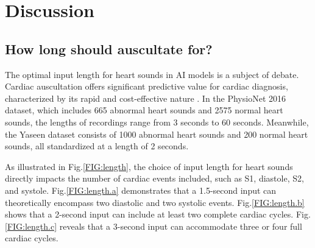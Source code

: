 \section{Discussion}\label{Discussion}
\subsection{How long should auscultate for?}
The optimal input length for heart sounds in AI models is a subject of debate. Cardiac auscultation offers significant predictive value for cardiac diagnosis, characterized by its rapid and cost-effective nature \cite{taylor2015learning}. In the PhysioNet 2016 dataset, which includes 665 abnormal heart sounds and 2575 normal heart sounds, the lengths of recordings range from 3 seconds to 60 seconds. Meanwhile, the Yaseen dataset consists of 1000 abnormal heart sounds and 200 normal heart sounds, all standardized at a length of 2 seconds.

As illustrated in Fig.\ref{FIG:length}, the choice of input length for heart sounds directly impacts the number of cardiac events included, such as S1, diastole, S2, and systole. Fig.\ref{FIG:length.a} demonstrates that a 1.5-second input can theoretically encompass two diastolic and two systolic events. Fig.\ref{FIG:length.b} shows that a 2-second input can include at least two complete cardiac cycles. Fig.\ref{FIG:length.c} reveals that a 3-second input can accommodate three or four full cardiac cycles. 

